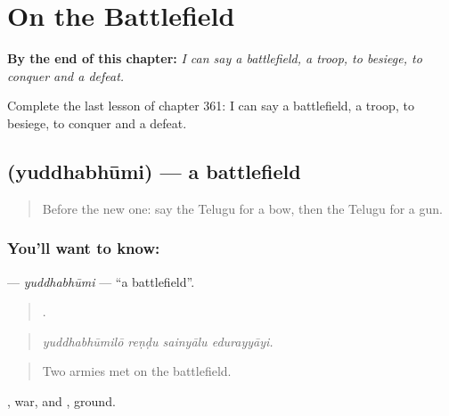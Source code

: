 
\chapter{On the Battlefield}
\label{ch:te-on-the-battlefield}

\begin{chapteropening}
\textbf{By the end of this chapter:} \emph{I can say a battlefield, a troop, to besiege, to conquer and a defeat.}

Complete the last lesson of chapter 361: I can say a battlefield, a troop, to besiege, to conquer and a defeat.
\end{chapteropening}

\section[\texorpdfstring{\te{యుద్ధభూమి} (yuddhabhūmi)}{యుద్ధభూమి (yuddhabhūmi)}]{ (yuddhabhūmi) — a battlefield}

\label{lesson:TE-C361-yuddhabhumi}



\begin{quote}
Before the new one: say the Telugu for a bow, then the Telugu for a gun.
\end{quote}

\subsection*{You'll want to know: }
\textbf{} — \emph{yuddhabhūmi} — \textquotedblleft{}a battlefield\textquotedblright{}.

\begin{quote}
   .
\end{quote}

\begin{quote}
\emph{yuddhabhūmilō reṇḍu sainyālu edurayyāyi.}
\end{quote}

\begin{quote}
Two armies met on the battlefield.
\end{quote}

, war, and , ground.

